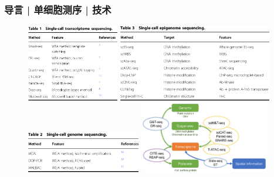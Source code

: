 \documentclass[11pt]{ctexbeamer}
\begin{document}
\begin{frame}
  \frametitle{导言 | 单细胞测序 | 技术}
  \begin{figure}
    \centering
    \includegraphics[width=0.36\textwidth]{sc_seq_RNA.png}\hspace{0.5em}
    \includegraphics[width=0.6\textwidth]{sc_seq_EPI.png}\\
    \vspace{1em}
    \includegraphics[width=0.45\textwidth]{sc_seq_DNA.png}\hspace{1em}
    \includegraphics[width=0.5\textwidth]{sc_seq_Multi.png}
  \end{figure}
\end{frame}
\end{document}
